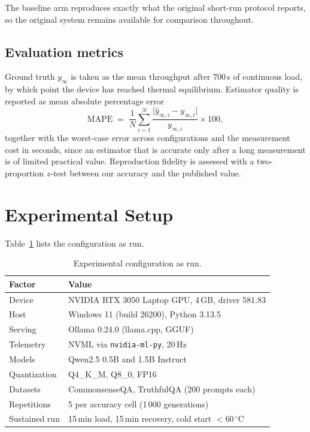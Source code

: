 \documentclass[11pt,a4paper]{article}
\begin{document}
The baseline arm reproduces exactly what the original short-run protocol
reports, so the original system remains available for comparison throughout.

\subsection{Evaluation metrics}
Ground truth $y_\infty$ is taken as the mean throughput after 700\,s of
continuous load, by which point the device has reached thermal equilibrium.
Estimator quality is reported as mean absolute percentage error
\[
\mathrm{MAPE} \;=\; \frac{1}{N}\sum_{i=1}^{N}
\frac{\lvert \hat{y}_{\infty,i} - y_{\infty,i}\rvert}{y_{\infty,i}}\times 100,
\]
together with the worst-case error across configurations and the measurement
cost in seconds, since an estimator that is accurate only after a long
measurement is of limited practical value. Reproduction fidelity is assessed
with a two-proportion $z$-test between our accuracy and the published value.

\section{Experimental Setup}

Table~\ref{tab:setup} lists the configuration as run.

\begin{table}[h]
\centering
\caption{Experimental configuration as run.}
\label{tab:setup}
\begin{tabular}{ll}
\toprule
Factor & Value \\
\midrule
Device        & NVIDIA RTX 3050 Laptop GPU, 4\,GB, driver 581.83 \\
Host          & Windows 11 (build 26200), Python 3.13.5 \\
Serving       & Ollama 0.24.0 (llama.cpp, GGUF) \\
Telemetry     & NVML via \texttt{nvidia-ml-py}, 20\,Hz \\
Models        & Qwen2.5 0.5B and 1.5B Instruct \\
Quantization  & Q4\_K\_M, Q8\_0, FP16 \\
Datasets      & CommonsenseQA, TruthfulQA (200 prompts each) \\
Repetitions   & 5 per accuracy cell (1\,000 generations) \\
Sustained run & 15\,min load, 15\,min recovery, cold start $<60\,^\circ$C \\
\bottomrule
\end{tabular}
\end{table}
\end{document}
